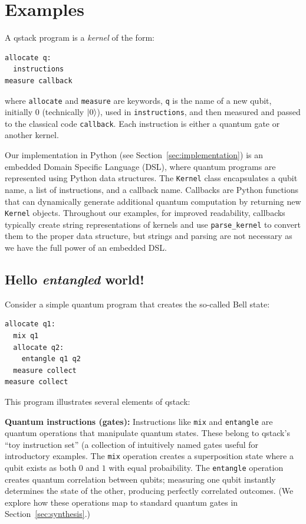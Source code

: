 \section{Examples}\label{sec:examples}

A qstack program is a \emph{kernel} of the form:

\begin{verbatim}
allocate q:
  instructions
measure callback
\end{verbatim}

where \texttt{allocate} and \texttt{measure} are keywords, \texttt{q} is the name of a new qubit, initially $0$ (technically $|0\rangle$), used in \texttt{instructions}, and then measured and passed to the classical code \texttt{callback}. Each instruction is either a quantum gate or another kernel.

Our implementation in Python (see Section~\ref{sec:implementation}) is an embedded Domain Specific Language (DSL), where quantum programs are represented using Python data structures. The \texttt{Kernel} class encapsulates a qubit name, a list of instructions, and a callback name. Callbacks are Python functions that can dynamically generate additional quantum computation by returning new \texttt{Kernel} objects. Throughout our examples, for improved readability, callbacks typically create string representations of kernels and use \texttt{parse\_kernel} to convert them to the proper data structure, but strings and parsing are not necessary as we have the full power of an embedded DSL.

\subsection{Hello \textit{entangled} world!}

Consider a simple quantum program that creates the so-called Bell state:

\begin{verbatim}
allocate q1:
  mix q1
  allocate q2:
    entangle q1 q2
  measure collect
measure collect
\end{verbatim}

This program illustrates several elements of qstack:

\textbf{Quantum instructions (gates):} Instructions like \texttt{mix} and \texttt{entangle} are quantum operations that manipulate quantum states. These belong to qstack's ``toy instruction set'' (a collection of intuitively named gates useful for introductory examples. The \texttt{mix} operation creates a superposition state where a qubit exists as both $0$ and $1$ with equal probaibility. The \texttt{entangle} operation creates quantum correlation between qubits; measuring one qubit instantly determines the state of the other, producing perfectly correlated outcomes. (We explore how these operations map to standard quantum gates in Section~\ref{sec:synthesis}.)

